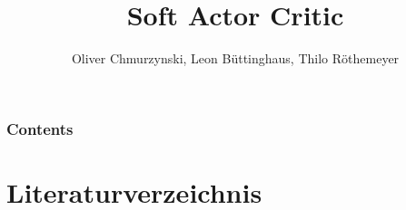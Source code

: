 \documentclass[11pt]{beamer}
\author{Oliver Chmurzynski, Leon Büttinghaus, Thilo Röthemeyer}
\title{Soft Actor Critic}
\begin{document}
\begin{frame}
\titlepage
\end{frame}


\begin{frame}
    \frametitle{Contents}
    \tableofcontents
\end{frame}





\section{Literaturverzeichnis}
\begin{frame}
{\footnotesize
\nocite{SAC19}
\nocite{SAC18}
\nocite{autoencoding}
\nocite{grokking}

}
\end{frame}
\end{document}
